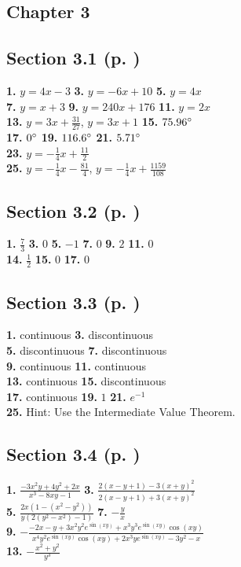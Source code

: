 \begin{multicols*}{2}
\section*{Chapter 3}
\subsection*{Section 3.1 (p. \pageref{sec3dot1})}
\textbf{1.} $y=4x-3$ \quad
\textbf{3.} $y=-6x+10$ \quad
\textbf{5.} $y=4x$\\
\textbf{7.} $y=x+3$ \quad
\textbf{9.} $y=240x+176$ \quad
\textbf{11.} $y=2x$\\
\textbf{13.} $y=3x + \frac{31}{27}$, $y=3x+1$ \quad
\textbf{15.} $75.96^\circ$\\
\textbf{17.} $0^\circ$ \quad
\textbf{19.} $116.6^\circ$ \quad
\textbf{21.} $5.71^\circ$\\
\textbf{23.} $y=-\tfrac{1}{4}x+\tfrac{11}{2}$\\
\textbf{25.} $y=-\frac{1}{4}x-\tfrac{81}{4}$, $y=-\frac{1}{4}x+\tfrac{1159}{108}$
\subsection*{Section 3.2 (p. \pageref{sec3dot2})}
\textbf{1.} $\frac{7}{3}$ \quad
\textbf{3.} $0$ \quad
\textbf{5.} $-1$ \quad
\textbf{7.} $0$ \quad
\textbf{9.} $2$ \quad
\textbf{11.} $0$\\
\textbf{14.} $\frac{1}{2}$ \quad
\textbf{15.} $0$ \quad
\textbf{17.} $0$
\subsection*{Section 3.3 (p. \pageref{sec3dot3})}
\textbf{1.} continuous \quad
\textbf{3.} discontinuous\\
\textbf{5.} discontinuous \quad
\textbf{7.} discontinuous\\
\textbf{9.} continuous \quad
\textbf{11.} continuous\\
\textbf{13.} continuous \quad
\textbf{15.} discontinuous\\
\textbf{17.} continuous \quad
\textbf{19.} $1$ \quad
\textbf{21.} $e^{-1}$\\
\textbf{25.} Hint: Use the Intermediate Value Theorem.
\subsection*{Section 3.4 (p. \pageref{sec3dot4})}
\textbf{1.} $\frac{-3x^2y + 4y^2 + 2x}{x^3 - 8xy - 1}$ \quad
\textbf{3.} $\frac{2(x-y+1) - 3(x+y)^2}{2(x-y+1) + 3(x+y)^2}$\\
\textbf{5.} $\frac{2x(1 - (x^2 - y^2))}{y(2(y^2 - x^2) - 1)}$ \quad
\textbf{7.} $-\frac{y}{x}$\\
\textbf{9.} $-\frac{-2x - y + 3x^2y^2e^{\sin (xy)} + x^3y^3e^{\sin (xy)}\cos (xy)}{x^4y^2e^{\sin (xy)}\cos (xy)
+ 2x^3ye^{\sin (xy)} - 3y^2 - x}$\\
\textbf{13.} $-\frac{x^2 + y^2}{y^3}$

\end{multicols*}
